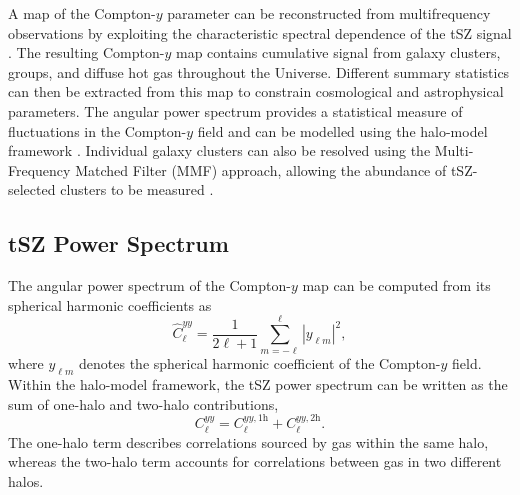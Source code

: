 \documentclass[aps,prd,twocolumn,superscriptaddress,nofootinbib,floatfix]{revtex4-2}
\begin{document}
A map of the Compton-$y$ parameter can be reconstructed from multifrequency observations by exploiting the characteristic spectral dependence of the tSZ signal \citep{Planck2015XXII}. The resulting Compton-$y$ map contains cumulative signal from galaxy clusters, groups, and diffuse hot gas throughout the Universe. Different summary statistics can then be extracted from this map to constrain cosmological and astrophysical parameters. The angular power spectrum provides a statistical measure of fluctuations in the Compton-$y$ field and can be modelled using the halo-model framework \citep{CooraySheth2002,KomatsuSeljak2002,HillPajer2013}. Individual galaxy clusters can also be resolved using the Multi-Frequency Matched Filter (MMF) approach, allowing the abundance of tSZ-selected clusters to be measured \citep{Melin2006}.

\subsection{tSZ Power Spectrum}
The angular power spectrum of the Compton-$y$ map can be computed from its spherical harmonic coefficients as
\begin{equation}
    \hat{C}_{\ell}^{yy}
    =
    \frac{1}{2\ell+1}
    \sum_{m=-\ell}^{\ell}
    \left|y_{\ell m}\right|^2,
    \label{eq:tsz_power_spectrum_estimator}
\end{equation}
where $y_{\ell m}$ denotes the spherical harmonic coefficient of the Compton-$y$ field. Within the halo-model framework, the tSZ power spectrum can be written as the sum of one-halo and two-halo contributions,
\begin{equation}
C_{\ell}^{yy}
=
C_{\ell}^{yy,\mathrm{1h}}
+
C_{\ell}^{yy,\mathrm{2h}}.
\label{eq:tsz_halo_model_decomposition}
\end{equation}
The one-halo term describes correlations sourced by gas within the same halo, whereas the two-halo term accounts for correlations between gas in two different halos.
\end{document}
